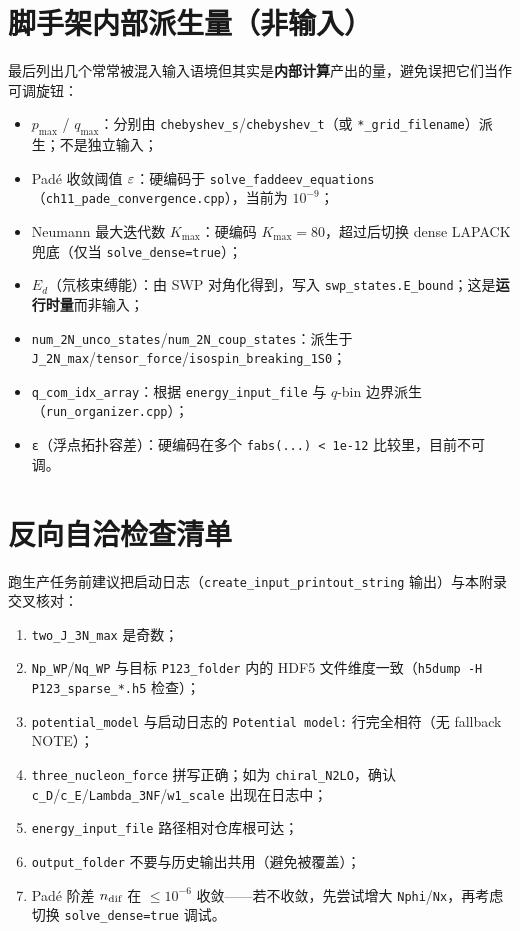 \section{脚手架内部派生量（非输入）}
\label{sec:appE_derived}

最后列出几个常常被混入输入语境但其实是\textbf{内部计算}产出的量，避免误把它们当作可调旋钮：
\begin{itemize}
  \item \(p_{\max}\) / \(q_{\max}\)：分别由 \texttt{chebyshev\_s}/\texttt{chebyshev\_t}（或 \texttt{*\_grid\_filename}）派生；不是独立输入；
  \item Padé 收敛阈值 \(\varepsilon\)：硬编码于 \texttt{solve\_faddeev\_equations}（\texttt{ch11\_pade\_convergence.cpp}），当前为 \(10^{-9}\)；
  \item Neumann 最大迭代数 \(K_{\max}\)：硬编码 \(K_{\max}=80\)，超过后切换 dense LAPACK 兜底（仅当 \texttt{solve\_dense=true}）；
  \item \(E_d\)（氘核束缚能）：由 SWP 对角化得到，写入 \texttt{swp\_states.E\_bound}；这是\textbf{运行时量}而非输入；
  \item \texttt{num\_2N\_unco\_states}/\texttt{num\_2N\_coup\_states}：派生于 \texttt{J\_2N\_max}/\texttt{tensor\_force}/\texttt{isospin\_breaking\_1S0}；
  \item \texttt{q\_com\_idx\_array}：根据 \texttt{energy\_input\_file} 与 \(q\)-bin 边界派生（\texttt{run\_organizer.cpp}）；
  \item \texttt{ε}（浮点拓扑容差）：硬编码在多个 \texttt{fabs(...) < 1e-12} 比较里，目前不可调。
\end{itemize}

\section{反向自洽检查清单}
\label{sec:appE_self_check}

跑生产任务前建议把启动日志（\texttt{create\_input\_printout\_string} 输出）与本附录交叉核对：
\begin{enumerate}
  \item \texttt{two\_J\_3N\_max} 是奇数；
  \item \texttt{Np\_WP}/\texttt{Nq\_WP} 与目标 \texttt{P123\_folder} 内的 HDF5 文件维度一致（\texttt{h5dump -H P123\_sparse\_*.h5} 检查）；
  \item \texttt{potential\_model} 与启动日志的 \texttt{Potential model:} 行完全相符（无 fallback NOTE）；
  \item \texttt{three\_nucleon\_force} 拼写正确；如为 \texttt{chiral\_N2LO}，确认 \texttt{c\_D}/\texttt{c\_E}/\texttt{Lambda\_3NF}/\texttt{w1\_scale} 出现在日志中；
  \item \texttt{energy\_input\_file} 路径相对仓库根可达；
  \item \texttt{output\_folder} 不要与历史输出共用（避免被覆盖）；
  \item Padé 阶差 \(n_{\text{dif}}\) 在 \(\le 10^{-6}\) 收敛——若不收敛，先尝试增大 \texttt{Nphi}/\texttt{Nx}，再考虑切换 \texttt{solve\_dense=true} 调试。
\end{enumerate}

